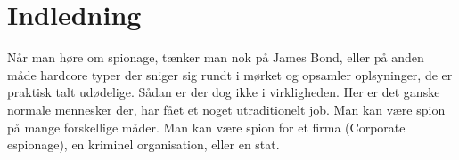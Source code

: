 \newpage
\section{Indledning}
Når man høre om spionage, tænker man nok på James Bond, eller på anden måde hardcore typer der sniger sig rundt i mørket og opsamler oplsyninger, de er praktisk talt udødelige. Sådan er der dog ikke i virkligheden. Her er det ganske normale mennesker der, har fået et noget utraditionelt job. Man kan være spion på mange forskellige måder. Man kan være spion for et firma (Corporate espionage), en kriminel organisation, eller en stat. 